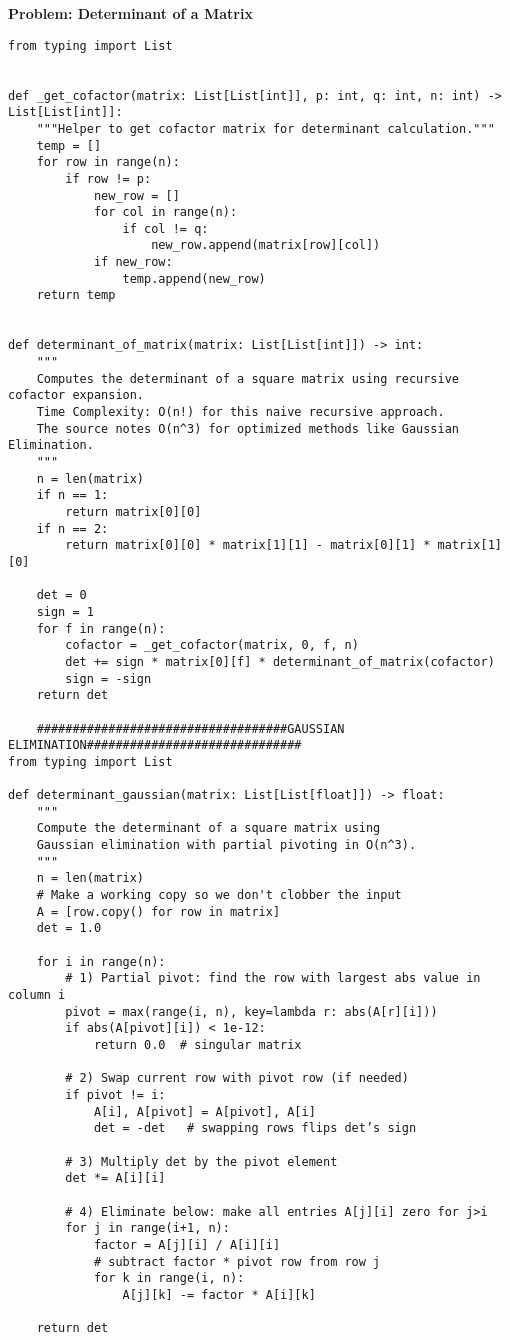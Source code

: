 \noindent\textbf{Problem: Determinant of a Matrix}
\begin{verbatim}
from typing import List


def _get_cofactor(matrix: List[List[int]], p: int, q: int, n: int) -> List[List[int]]:
    """Helper to get cofactor matrix for determinant calculation."""
    temp = []
    for row in range(n):
        if row != p:
            new_row = []
            for col in range(n):
                if col != q:
                    new_row.append(matrix[row][col])
            if new_row:
                temp.append(new_row)
    return temp


def determinant_of_matrix(matrix: List[List[int]]) -> int:
    """
    Computes the determinant of a square matrix using recursive cofactor expansion.
    Time Complexity: O(n!) for this naive recursive approach.
    The source notes O(n^3) for optimized methods like Gaussian Elimination.
    """
    n = len(matrix)
    if n == 1:
        return matrix[0][0]
    if n == 2:
        return matrix[0][0] * matrix[1][1] - matrix[0][1] * matrix[1][0]

    det = 0
    sign = 1
    for f in range(n):
        cofactor = _get_cofactor(matrix, 0, f, n)
        det += sign * matrix[0][f] * determinant_of_matrix(cofactor)
        sign = -sign
    return det

    ###################################GAUSSIAN ELIMINATION##############################
from typing import List

def determinant_gaussian(matrix: List[List[float]]) -> float:
    """
    Compute the determinant of a square matrix using
    Gaussian elimination with partial pivoting in O(n^3).
    """
    n = len(matrix)
    # Make a working copy so we don't clobber the input
    A = [row.copy() for row in matrix]
    det = 1.0

    for i in range(n):
        # 1) Partial pivot: find the row with largest abs value in column i
        pivot = max(range(i, n), key=lambda r: abs(A[r][i]))
        if abs(A[pivot][i]) < 1e-12:
            return 0.0  # singular matrix

        # 2) Swap current row with pivot row (if needed)
        if pivot != i:
            A[i], A[pivot] = A[pivot], A[i]
            det = -det   # swapping rows flips det’s sign

        # 3) Multiply det by the pivot element
        det *= A[i][i]

        # 4) Eliminate below: make all entries A[j][i] zero for j>i
        for j in range(i+1, n):
            factor = A[j][i] / A[i][i]
            # subtract factor * pivot row from row j
            for k in range(i, n):
                A[j][k] -= factor * A[i][k]

    return det

\end{verbatim}


